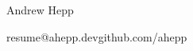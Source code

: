 \begin{center}
   \huge Andrew Hepp \normalsize
\end{center}
resume@ahepp.dev\hfill github.com/ahepp
